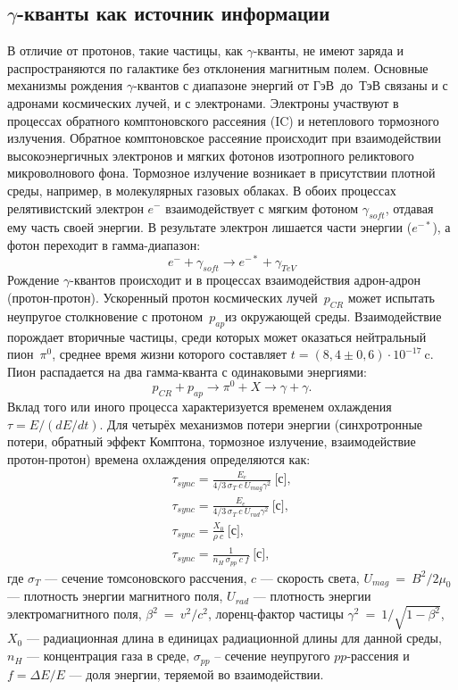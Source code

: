 \documentclass[magd,floatypics,numeref]{msudipl} %
\begin{document}
\subsection{$\gamma$-кванты как источник информации}
В отличие от протонов, такие частицы, как $\gamma$-кванты, не имеют заряда и распространяются по галактике без отклонения магнитным полем. Основные механизмы рождения $\gamma$-квантов с диапазоне энергий от ГэВ~до~ТэВ связаны и с адронами космических лучей, и с электронами. Электроны участвуют в процессах обратного комптоновского рассеяния (IC) и нетеплового тормозного излучения. Обратное комптоновское рассеяние происходит при взаимодействии высокоэнергичных электронов и мягких фотонов изотропного реликтового микроволнового фона. Тормозное излучение возникает в присутствии плотной среды, например, в молекулярных газовых облаках. В обоих процессах релятивистский электрон $e^-$ взаимодействует с мягким фотоном $\gamma_{soft}$, отдавая ему часть своей энергии. В результате электрон лишается части энергии ($e^{-*}$), а фотон переходит в гамма-диапазон:
\begin{equation}
e^- + \gamma_{soft} \rightarrow e^{-*} + \gamma_{TeV}
\end{equation}
Рождение $\gamma$-квантов происходит и в процессах взаимодействия адрон-адрон (протон-протон). Ускоренный протон космических лучей~$p_{CR}$ может испытать неупругое столкновение с протоном~$p_{ap}$из окружающей среды. Взаимодействие порождает вторичные частицы, среди которых может оказаться нейтральный пион~$\pi^0$, среднее время жизни которого составляет $t=(8,4\pm0,6)\cdot10^{-17}~$c. Пион распадается на два гамма-кванта с одинаковыми энергиями:
\begin{equation}
p_{CR}+p_{ap}\rightarrow\pi^0+X\rightarrow \gamma+\gamma.
\end{equation}
Вклад того или иного процесса характеризуется временем охлаждения $\tau=E/(dE/dt)$. Для четырёх механизмов потери энергии (синхротронные потери, обратный эффект Комптона, тормозное излучение, взаимодействие протон-протон) времена охлаждения определяются как:
\begin{align}
\tau_{sync} = \frac{E_e}{4/3 \,\sigma_T~c~U_{mag} \gamma^2}~\text{[с]}, \\
\tau_{sync} = \frac{E_e}{4/3 \,\sigma_T ~c~U_{rad}   \gamma^2}~\text{[с]}, \\
\tau_{sync} = \frac{X_0}{\rho~c}~\text{[с]}, \\
\tau_{sync} = \frac{1}{n_H \,\sigma_{pp}~c~f}~\text{[с]},
\end{align}
где $\sigma_T$ --- сечение томсоновского рассчения, $c$ --- скорость света,  $U_{mag}~=~B^2/2\mu_0$ --- плотность энергии магнитного поля, $U_{rad}$ --- плотность энергии электромагнитного поля, $\beta^2~=~v^2/c^2$, лоренц-фактор частицы $\gamma^2~=~1/\sqrt{1-\beta^2}$, $X_0$ --- радиационная длина в единицах радиационной длины для данной среды, $n_H$ --- концентрация газа в среде, $\sigma_{pp}$ -- сечение неупругого $pp$-рассения и $f = \Delta E/E$ --- доля энергии, теряемой во взаимодействии. 
\end{document}
